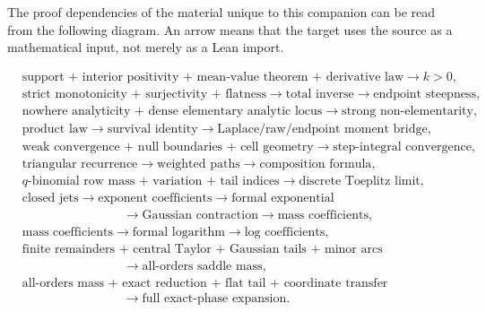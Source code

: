 \documentclass[11pt,oneside]{article}
\theoremstyle{definition}
\theoremstyle{remark}
\begin{document}
The proof dependencies of the material unique to this companion can be read from the
following diagram.  An arrow means that the target uses the source as a mathematical input,
not merely as a Lean import.

\begin{center}
\begin{minipage}{0.96\textwidth}\footnotesize
\begin{align*}
 &\text{support + interior positivity + mean-value theorem + derivative law}
   \longrightarrow k>0,\\[0.35ex]
 &\text{strict monotonicity + surjectivity + flatness}
   \longrightarrow \text{total inverse}
   \longrightarrow \text{endpoint steepness},\\[0.35ex]
 &\text{nowhere analyticity + dense elementary analytic locus}
   \longrightarrow \text{strong non-elementarity},\\[0.35ex]
 &\text{product law}
   \longrightarrow \text{survival identity}
   \longrightarrow \text{Laplace/raw/endpoint moment bridge},\\[0.35ex]
 &\text{weak convergence + null boundaries + cell geometry}
   \longrightarrow \text{step-integral convergence},\\[0.35ex]
 &\text{triangular recurrence}
   \longrightarrow \text{weighted paths}
   \longrightarrow \text{composition formula},\\[0.35ex]
 &\text{$q$-binomial row mass + variation + tail indices}
   \longrightarrow \text{discrete Toeplitz limit},\\[0.35ex]
 &\text{closed jets}
   \longrightarrow \text{exponent coefficients}
   \longrightarrow \text{formal exponential}\\[-0.1ex]
 &\hspace{8em}\longrightarrow \text{Gaussian contraction}
   \longrightarrow \text{mass coefficients},\\[0.35ex]
 &\text{mass coefficients}
   \longrightarrow \text{formal logarithm}
   \longrightarrow \text{log coefficients},\\[0.35ex]
 &\text{finite remainders + central Taylor + Gaussian tails + minor arcs}\\[-0.1ex]
 &\hspace{8em}\longrightarrow \text{all-orders saddle mass},\\[0.35ex]
 &\text{all-orders mass + exact reduction + flat tail + coordinate transfer}\\[-0.1ex]
 &\hspace{8em}\longrightarrow \text{full exact-phase expansion}.
\end{align*}
\end{minipage}
\end{center}
\end{document}
